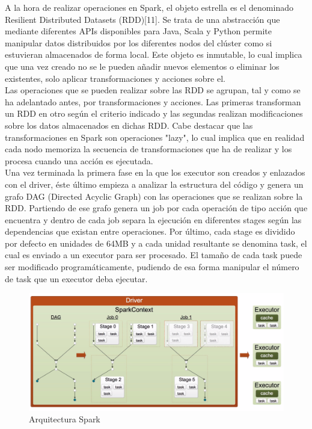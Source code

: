 A la hora de realizar operaciones en Spark, el objeto estrella es el denominado Resilient Distributed Datasets (RDD)[11]. Se trata de una abstracción que mediante diferentes APIs disponibles para Java, Scala y Python permite manipular datos distribuidos por los diferentes nodos del clúster como si estuvieran almacenados de forma local. Este objeto es inmutable, lo cual implica que una vez creado no se le pueden añadir nuevos elementos o eliminar los existentes, solo aplicar transformaciones y acciones sobre el.\\

Las operaciones que se pueden realizar sobre las RDD se agrupan, tal y como se ha adelantado antes, por transformaciones y acciones. Las primeras transforman un RDD en otro según el criterio indicado y las segundas realizan modificaciones sobre los datos almacenados en dichas RDD. Cabe destacar que las transformaciones en Spark son operaciones "lazy", lo cual implica que en realidad cada nodo memoriza la secuencia de transformaciones que ha de realizar y los procesa cuando una acción es ejecutada.\\

Una vez terminada la primera fase en la que los executor son creados y enlazados con el driver, éste último empieza a analizar la estructura del código y genera un grafo DAG (Directed Acyclic Graph) con las operaciones que se realizan sobre la RDD. Partiendo de ese grafo genera un job por cada operación de tipo acción que encuentra y dentro de cada job separa la ejecución en diferentes stages según las dependencias que existan entre operaciones. Por último, cada stage es dividido por defecto en unidades de 64MB y a cada unidad resultante se denomina task, el cual es enviado a un executor para ser procesado. El tamaño de cada task puede ser modificado programáticamente, pudiendo de esa forma manipular el número de task que un executor deba ejecutar.\\

\begin{figure}[h]
	\centering
	\includegraphics[width=1\textwidth]{Ilustraciones/spark_task_creation.png}
	\caption{Arquitectura Spark}
	\label{fig:spark_task_creation}
\end{figure}

